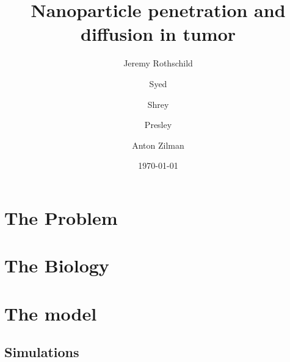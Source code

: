 \documentclass[aip, jmp, amsmath,amssymb, preprint, reprint, author-year,%
]{revtex4-1}
\begin{document}

\title[Summary to help me remember what is going on]{Nanoparticle penetration and diffusion in tumor}%

\author{Jeremy Rothschild}
\author{Syed}
\author{Shrey}
\author{Presley}
\author{Anton Zilman}%


\date{\today}%


\maketitle



\section{\label{sec:prob}The Problem}


\section{\label{sec:bio}The Biology}


\section{\label{sec:model}The model}

\subsection{\label{subsec:euler}Simulations}




%
\end{document}
